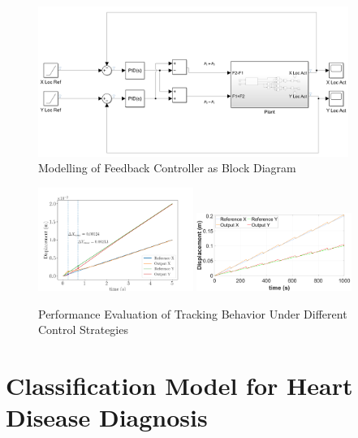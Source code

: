 \documentclass[12pt]{article}
\begin{document}
\begin{enumerate}
    \begin{figure}[H]
        \centering
        \includegraphics[width=0.9\textwidth]{portfolio/Robot_ClosedLoop.png}
        \caption{Modelling of Feedback Controller as Block Diagram}
        \label{Control-Blockdiagram}
    \end{figure}

    \begin{figure}[H]
        \centering
        \includegraphics[width=0.45\textwidth]{portfolio/fig01_TrackingBehavior.png}
        \includegraphics[width=0.45\textwidth]{portfolio/feedforward_track.png}
        \caption{Performance Evaluation of Tracking Behavior Under Different Control Strategies}
        \label{Control-RobotSwimmer}
    \end{figure}
    
\end{enumerate}

\newpage



\section{Classification Model for Heart Disease Diagnosis}
\end{document}
